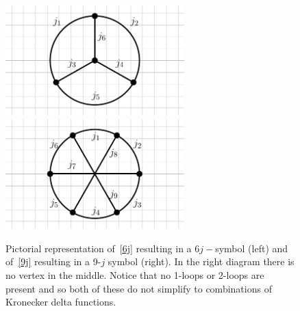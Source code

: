 \begin{figure}
    \centering
    \includegraphics[width=69mm]{Graphs/6j.pdf}
    \includegraphics[width=69mm]{Graphs/9j.pdf}
    \caption{Pictorial representation of~\eqref{6j} resulting in a $6j-$symbol (left) and of~\eqref{9j}  resulting in a 9-$j$ symbol (right). In the right diagram there is no vertex in the middle\footnotemark. Notice that no 1-loops or 2-loops are present and so both of these do not simplify to combinations of Kronecker delta functions.}
    \label{fig:jsymbols}
\end{figure}


